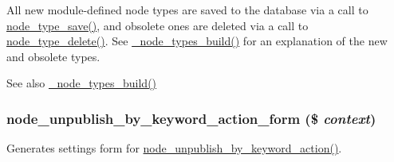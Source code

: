 All new module-\/defined node types are saved to the database via a call to \hyperlink{node_8module_a9a5c06f9903cea586bd44a7d6e9e086c}{node\_\-type\_\-save()}, and obsolete ones are deleted via a call to \hyperlink{node_8module_a7fe2d244b6635513800a027053144425}{node\_\-type\_\-delete()}. See \hyperlink{node_8module_a31b891b6c1ffba98fd4478e4255e301b}{\_\-node\_\-types\_\-build()} for an explanation of the new and obsolete types.

\begin{DoxySeeAlso}{See also}
\hyperlink{node_8module_a31b891b6c1ffba98fd4478e4255e301b}{\_\-node\_\-types\_\-build()} 
\end{DoxySeeAlso}
\hypertarget{node_8module_af8e8ad9a0d7070eb2c653634fee434cc}{
\subsubsection[{node\_\-unpublish\_\-by\_\-keyword\_\-action\_\-form}]{\setlength{\rightskip}{0pt plus 5cm}node\_\-unpublish\_\-by\_\-keyword\_\-action\_\-form (\$ {\em context})}}
\label{node_8module_af8e8ad9a0d7070eb2c653634fee434cc}
Generates settings form for \hyperlink{group__actions_gaa453e8f47436b80070213abd851535d0}{node\_\-unpublish\_\-by\_\-keyword\_\-action()}.


